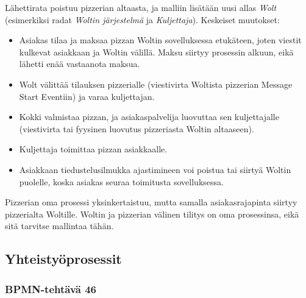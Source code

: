 \documentclass[
  finnish,
  letterpaper,
  DIV=11,
  numbers=noendperiod,
  oneside]{scrreprt}
\providecommand{\tightlist}{%
  \setlength{\itemsep}{0pt}\setlength{\parskip}{0pt}}
\begin{document}
\begin{tcolorbox}[enhanced jigsaw, arc=.35mm, bottomrule=.15mm, bottomtitle=1mm, breakable, colback=white, colbacktitle=quarto-callout-tip-color!10!white, colframe=quarto-callout-tip-color-frame, coltitle=black, left=2mm, leftrule=.75mm, opacityback=0, opacitybacktitle=0.6, rightrule=.15mm, title=\textcolor{quarto-callout-tip-color}{\faLightbulb}\hspace{0.5em}{Malliratkaisu}, titlerule=0mm, toprule=.15mm, toptitle=1mm]

Lähettirata poistuu pizzerian altaasta, ja malliin lisätään uusi allas
\emph{Wolt} (esimerkiksi radat \emph{Woltin järjestelmä} ja
\emph{Kuljettaja}). Keskeiset muutokset:

\begin{itemize}
\tightlist
\item
  Asiakas tilaa ja maksaa pizzan Woltin sovelluksessa etukäteen, joten
  viestit kulkevat asiakkaan ja Woltin välillä. Maksu siirtyy prosessin
  alkuun, eikä lähetti enää vastaanota maksua.
\item
  Wolt välittää tilauksen pizzerialle (viestivirta Woltista pizzerian
  Message Start Eventiin) ja varaa kuljettajan.
\item
  Kokki valmistaa pizzan, ja asiakaspalvelija luovuttaa sen
  kuljettajalle (viestivirta tai fyysinen luovutus pizzeriasta Woltin
  altaaseen).
\item
  Kuljettaja toimittaa pizzan asiakkaalle.
\item
  Asiakkaan tiedustelusilmukka ajastimineen voi poistua tai siirtyä
  Woltin puolelle, koska asiakas seuraa toimitusta sovelluksessa.
\end{itemize}

Pizzerian oma prosessi yksinkertaistuu, mutta samalla asiakasrajapinta
siirtyy pizzerialta Woltille. Woltin ja pizzerian välinen tilitys on oma
prosessinsa, eikä sitä tarvitse mallintaa tähän.

\end{tcolorbox}

\subsection{Yhteistyöprosessit}\label{yhteistyuxf6prosessit}

\subsubsection{BPMN-tehtävä 46}\label{bpmn-tehtuxe4vuxe4-46}
\end{document}

